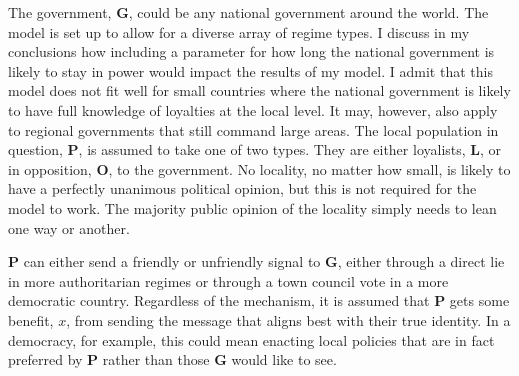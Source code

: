 \documentclass[12pt]{article}
\begin{document}
	The government, \textbf{G}, could be any national government around the world. The model is set up to allow for a diverse array of regime types. I discuss in my conclusions how including a parameter for how long the national government is likely to stay in power would impact the results of my model. I admit that this model does not fit well for small countries where the national government is likely to have full knowledge of loyalties at the local level. It may, however, also apply to regional governments that still command large areas. The local population in question, \textbf{P}, is assumed to take one of two types. They are either loyalists, \textbf{L}, or in opposition, \textbf{O}, to the government. No locality, no matter how small, is likely to have a perfectly unanimous political opinion, but this is not required for the model to work. The majority public opinion of the locality simply needs to lean one way or another.
	
	\textbf{P} can either send a friendly or unfriendly signal to \textbf{G}, either through a direct lie in more authoritarian regimes or through a town council vote in a more democratic country. Regardless of the mechanism, it is assumed that \textbf{P} gets some benefit, $x$, from sending the message that aligns best with their true identity. In a democracy, for example, this could mean enacting local policies that are in fact preferred by \textbf{P} rather than those \textbf{G} would like to see.
	
\end{document}
